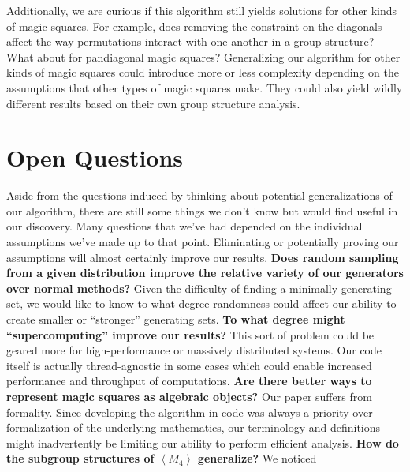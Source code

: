 \documentclass[12pt]{report}
\begin{document}
\par Additionally, we are curious if this algorithm still yields solutions for other kinds of magic
squares. For example, does removing the constraint on the diagonals affect the way permutations
interact with one another in a group structure? What about for pandiagonal magic squares?
Generalizing our algorithm for other kinds of magic squares could introduce more or less complexity
depending on the assumptions that other types of magic squares make. They could also yield wildly
different results based on their own group structure analysis.

\section{Open Questions}

\indent Aside from the questions induced by thinking about potential generalizations of our
algorithm, there are still some things we don't know but would find useful in our discovery. Many
questions that we've had depended on the individual assumptions we've made up to that point.
Eliminating or potentially proving our assumptions will almost certainly improve our results.
\linebreak
\linebreak
\textbf{Does random sampling from a given distribution improve the relative variety of our
  generators over normal methods?} Given the difficulty of finding a minimally generating set, we
would like to know to what degree randomness could affect our ability to create smaller or
``stronger'' generating sets.
\linebreak
\linebreak
\textbf{To what degree might ``supercomputing'' improve our results?} This sort of problem could be
geared more for high-performance or massively distributed systems. Our code itself is actually
thread-agnostic in some cases which could enable increased performance and throughput of
computations.
\linebreak
\linebreak
\textbf{Are there better ways to represent magic squares as algebraic objects?} Our paper suffers
from formality. Since developing the algorithm in code was always a priority over formalization of
the underlying mathematics, our terminology and definitions might inadvertently be limiting our
ability to perform efficient analysis.
\linebreak
\linebreak
\textbf{How do the subgroup structures of $\left\langle M_4 \right\rangle$ generalize?} We noticed
\end{document}
